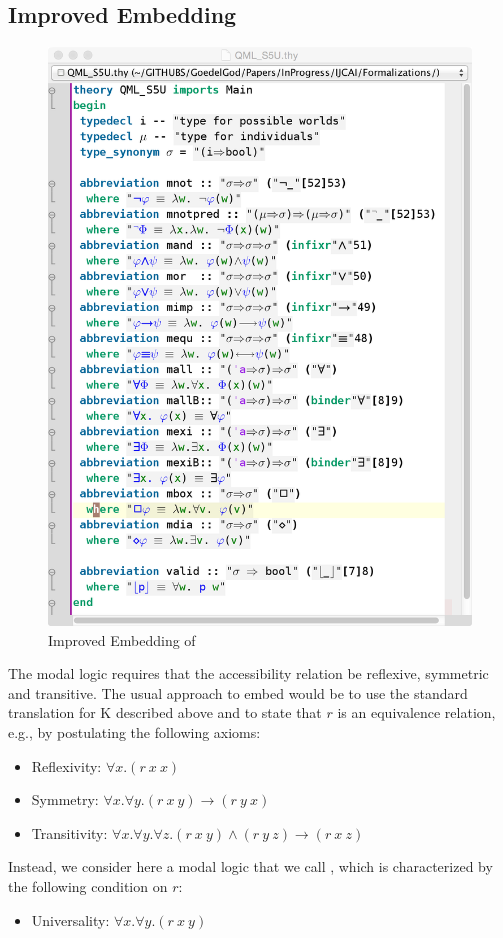 \documentclass{article}
\begin{document}
\subsection{Improved Embedding}\label{sec:improvedembedding}
\begin{figure}[t]
\centerline{\includegraphics[width=\columnwidth]{./Images/QML_S5U.png}}
\caption{Improved Embedding of \SFiveU} \label{QML_S5U}
\end{figure}

The modal logic \SFive requires that the accessibility relation be
reflexive, symmetric and transitive. The usual approach to embed
\SFive would be to use the standard translation for K described above
and to state that $r$ is an equivalence relation, e.g., by postulating
the following axioms:
\begin{itemize}
\item Reflexivity: $\forall x. (r~x~x)$
\item Symmetry: $\forall x. \forall y. (r~x~y) \rightarrow (r~y~x)$ 
\item Transitivity: $\forall x. \forall y. \forall z. (r~x~y) \wedge (r~y~z) \rightarrow (r~x~z)$
\end{itemize}
Instead, we consider here a modal logic that we call \SFiveU, which is
characterized by the following condition on $r$:
\begin{itemize}
\item Universality: $\forall x. \forall y. (r~x~y)$
\end{itemize}
\end{document}
